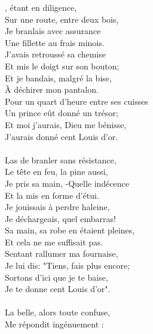 \vspace{-0.3cm}
, étant en diligence,
\\Sur une route, entre deux bois,
\\Je branlais avec assurance
\\Une fillette au frais minois.
\\J'avais retroussé sa chemise
\\Et mis le doigt sur son bouton;
\\Et je bandais, malgré la bise,
\\À déchirer mon pantalon.
\\Pour un quart d'heure entre ses cuisses
\\Un prince eût donné un trésor;
\\Et moi j'aurais, Dieu me bénisse,
\\J'aurais donné cent Louis d'or.
\\\\Las de branler sans résistance,
\\Le tête en feu, la pine aussi,
\\Je pris sa main, -Quelle indécence
\\Et la mis en forme d'étui.
\\Je jouissais à perdre haleine,
\\Je déchargeais, quel embarras!
\\Sa main, sa robe en étaient pleines,
\\Et cela ne me suffisait pas.
\\Sentant rallumer ma fournaise,
\\Je lui dis: "Tiens, fais plus encore;
\\Sortons d'ici que je te baise,
\\Je te donne cent Louis d'or".
\\\\La belle, alors toute confuse,
\\Me répondit ingénuement :
